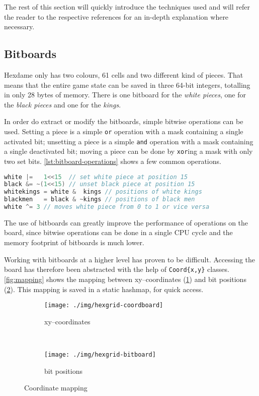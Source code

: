 \documentclass[a4paper,10pt]{article}
\begin{document}
The rest of this section will quickly introduce the techniques used and will refer the reader to the respective references for an in-depth explanation where necessary.

\subsection*{Bitboards}
Hexdame only has two colours, 61 cells and two different kind of pieces. That means that the entire game state can be saved in three 64-bit integers, totalling in only 28 bytes of memory. There is one bitboard for the \emph{white pieces}, one for the \emph{black pieces} and one for the \emph{kings}.

In order do extract or modify the bitboards, simple bitwise operations can be used. Setting a piece is a simple \texttt{or} operation with a mask containing a single activated bit; unsetting a piece is a simple \texttt{and} operation with a mask containing a single deactivated bit; moving a piece can be done by \texttt{xor}ing a mask with only two set bits. \autoref{lst:bitboard-operations} shows a few common operations.

\begin{lstlisting}[language=C++,caption={Bitboard operations},label=lst:bitboard-operations]
white |=   1<<15  // set white piece at position 15
black &= ~(1<<15) // unset black piece at position 15
whitekings = white &  kings // positions of white kings
blackmen   = black & ~kings // positions of black men
white ^= 3 // moves white piece from 0 to 1 or vice versa
\end{lstlisting}

The use of bitboards can greatly improve the performance of operations on the board, since bitwise operations can be done in a single CPU cycle and the memory footprint of bitboards is much lower.

Working with bitboards at a higher level has proven to be difficult. Accessing the board has therefore been abstracted with the help of \texttt{Coord\{x,y\}} classes. \autoref{fig:mapping} shows the mapping between xy--coordinates (\ref{fig:hexgrid-coordboard}) and bit positions (\ref{fig:hexgrid-bitboard}). This mapping is saved in a static hashmap, for quick access.

\begin{figure}
 \centering
 \begin{subfigure}[b]{.5\textwidth}
  \texttt{[image: ./img/hexgrid-coordboard]}
  \caption{xy--coordinates}
  \label{fig:hexgrid-coordboard}
 \end{subfigure}%
 ~ %
 \begin{subfigure}[b]{.5\textwidth}
  \texttt{[image: ./img/hexgrid-bitboard]}
  \caption{bit positions}
  \label{fig:hexgrid-bitboard}
 \end{subfigure}
 \caption{Coordinate mapping}\label{fig:mapping}
\end{figure}
\end{document}
